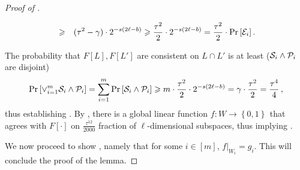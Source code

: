 \documentclass{toc}
\newcommand\set[1]{{\left\{ #1 \right\}}}
\newcommand\Prob[2]{{\Pr_{#1}\left[ {#2} \right]}}
\newcommand\power[1]{\set{0,1}^{#1}}
\renewcommand\geq{\geqslant}
\begin{document}
\begin{proof}[Proof of ]
\begin{itemize}
\begin{eqnarray*}
 &\geq& (\tau^2 - \gamma)\cdot 2^{-s(2\ell-b)} \geq \frac{\tau^2}{2} \cdot  2^{-s(2\ell-b)} = \frac{\tau^2}{2}
  \cdot \Prob{}{{\cal E}_i}\,.
  \end{eqnarray*}
\end{itemize}
The probability that $F[L], F[L']$ are consistent on $L \cap L'$ is at least ($  {\cal S}_i \wedge {\cal P}_i  $ are disjoint)
\begin{equation}\label{eqn:key-1}
 \Prob{}{\vee_{i=1}^m {\cal S}_i \wedge {\cal P}_i} = \sum_{i=1}^m \Prob{}{{\cal S}_i \wedge {\cal P}_i } \geq m \cdot \frac{\tau^2}{2} \cdot  2^{-s(2\ell-b)} = \gamma \cdot \frac{\tau^2}{2} = \frac{\tau^4}{4}\,,
\end{equation}
thus establishing .
By , there is a global linear function $f:W \to \power{}$ that agrees with $F[\cdot]$ on $\frac{\tau^{12}}{2000}$ fraction of $\ell$-dimensional subspaces, thus implying .

We now proceed to show , namely that for some $i\in[m]$, $f|_{W_i}=g_i$. This will conclude the proof of the lemma.


\end{proof}
\end{document}
